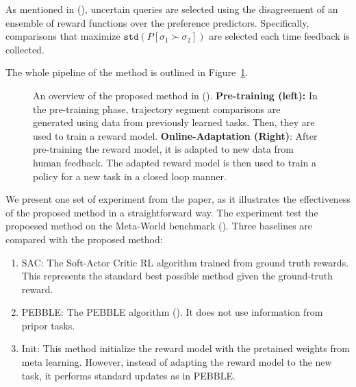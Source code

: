 \documentclass[
  letterpaper,
  numbers=noenddot,
  DIV=11]{scrreprt}
\theoremstyle{definition}
\theoremstyle{plain}
\theoremstyle{plain}
\theoremstyle{remark}
\begin{document}
As mentioned in (), uncertain queries are selected using the disagreement of an
ensemble of reward functions over the preference predictors.
Specifically, comparisons that maximize
\(\texttt{std}(P[\sigma_1 \succ \sigma_2])\) are selected each time
feedback is collected.

The whole pipeline of the method is outlined in Figure~\ref{fig-few-1}.

\begin{figure}


\caption{\label{fig-few-1}An overview of the proposed method in
().
\textbf{Pre-training (left):} In the pre-training phase, trajectory
segment comparisons are generated using data from previously learned
tasks. Then, they are used to train a reward model.
\textbf{Online-Adaptation (Right)}: After pre-training the reward model,
it is adapted to new data from human feedback. The adapted reward model
is then used to train a policy for a new task in a closed loop manner.}

\end{figure}%

We present one set of experiment from the paper, as it illustrates the
effectiveness of the proposed method in a straightforward way. The
experiment test the propoesed method on the Meta-World benchmark
(). Three baselines are
compared with the proposed method:

\begin{enumerate}
\def\labelenumi{\arabic{enumi}.}
\item
  SAC: The Soft-Actor Critic RL algorithm trained from ground truth
  rewards. This represents the standard best possible method given the
  ground-truth reward.
\item
  PEBBLE: The PEBBLE algorithm (). It does not use information from pripor tasks.
\item
  Init: This method initialize the reward model with the pretained
  weights from meta learning. However, instead of adapting the reward
  model to the new task, it performs standard updates as in PEBBLE.
\end{enumerate}
\end{document}
